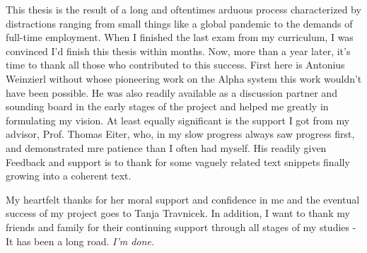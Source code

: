\documentclass[draft,final]{vutinfth} %
\theoremstyle{definition}
\begin{document}
\begin{acknowledgements*}
This thesis is the result of a long and oftentimes arduous process characterized by distractions ranging from small things like a global pandemic to the demands of full-time employment. When I finished the last exam from my curriculum, I was convinced I'd finish this thesis within months. Now, more than a year later, it's time to thank all those who contributed to this success. First here is Antonius Weinzierl without whose pioneering work on the Alpha system this work wouldn't have been possible. He was also readily available as a discussion partner and sounding board in the early stages of the project and helped me greatly in formulating my vision. At least equally significant is the support I got from my advisor, Prof. Thomas Eiter, who, in my slow progress always saw progress first, and demonstrated mre patience than I often had myself. His readily given Feedback and support is to thank for some vaguely related text snippets finally growing into a coherent text.

My heartfelt thanks for her moral support and confidence in me and the eventual success of my project goes to Tanja Travnicek. In addition, I want to thank my friends and family for their continuing support through all stages of my studies - It has been a long road. \emph{I'm done.}
\end{acknowledgements*}
\end{document}

